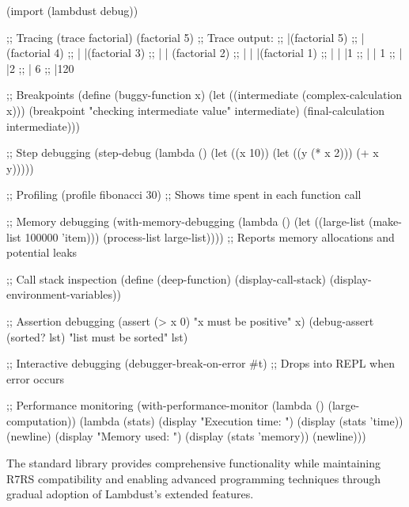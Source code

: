 \begin{example}
\begin{lambdustcode}
(import (lambdust debug))

;; Tracing
(trace factorial)
(factorial 5)
;; Trace output:
;; |(factorial 5)
;; | (factorial 4)
;; | |(factorial 3)
;; | | (factorial 2)
;; | | |(factorial 1)
;; | | |1
;; | | 1
;; | |2
;; | 6
;; |120

;; Breakpoints
(define (buggy-function x)
  (let ((intermediate (complex-calculation x)))
    (breakpoint "checking intermediate value" intermediate)
    (final-calculation intermediate)))

;; Step debugging
(step-debug
  (lambda ()
    (let ((x 10))
      (let ((y (* x 2)))
        (+ x y)))))

;; Profiling
(profile fibonacci 30)
;; Shows time spent in each function call

;; Memory debugging
(with-memory-debugging
  (lambda ()
    (let ((large-list (make-list 100000 'item)))
      (process-list large-list))))
;; Reports memory allocations and potential leaks

;; Call stack inspection
(define (deep-function)
  (display-call-stack)
  (display-environment-variables))

;; Assertion debugging
(assert (> x 0) "x must be positive" x)
(debug-assert (sorted? lst) "list must be sorted" lst)

;; Interactive debugging
(debugger-break-on-error #t)
;; Drops into REPL when error occurs

;; Performance monitoring
(with-performance-monitor
  (lambda ()
    (large-computation))
  (lambda (stats)
    (display "Execution time: ") (display (stats 'time)) (newline)
    (display "Memory used: ") (display (stats 'memory)) (newline)))
\end{lambdustcode}
\end{example}

The standard library provides comprehensive functionality while maintaining R7RS compatibility and enabling advanced programming techniques through gradual adoption of Lambdust's extended features.